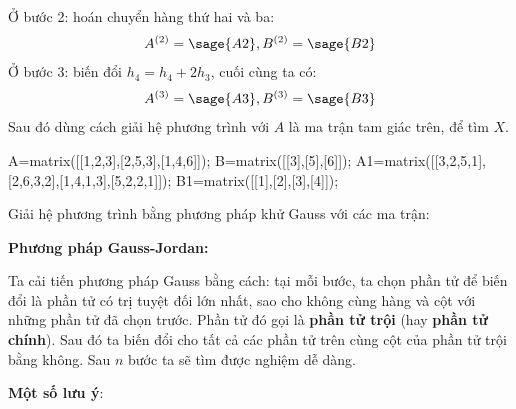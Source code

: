 \documentclass[12pt]{article}
\begin{document}
Ở bước 2: hoán chuyển hàng thứ hai và ba:
\begin{align}
 A^{(2)}=\sage{A2}, B^{(2)}=\sage{B2}
\end{align}
Ở bước 3: biến đổi $h_4=h_4+2h_3$, cuối cùng ta có:
\begin{align}
 A^{(3)}=\sage{A3}, B^{(3)}=\sage{B3}
\end{align}
Sau đó dùng cách giải hệ phương trình với $A$ là ma trận tam giác trên, để tìm $X$.

\newpage{}

\begin{sagesilent}
A=matrix([[1,2,3],[2,5,3],[1,4,6]]);
B=matrix([[3],[5],[6]]);
A1=matrix([[3,2,5,1],[2,6,3,2],[1,4,1,3],[5,2,2,1]]);
B1=matrix([[1],[2],[3],[4]]);
\end{sagesilent}
Giải hệ phương trình bằng phương pháp khử Gauss với các ma trận:

\newpage{}

\textbf{Phương pháp Gauss-Jordan:}

Ta cải tiến phương pháp Gauss bằng cách: tại mỗi bước, ta chọn phần tử để biến đổi là phần tử có trị tuyệt đối lớn nhất, sao cho không cùng hàng và cột với những phần tử đã chọn trước. Phần tử đó gọi là \textbf{phần tử trội} (hay \textbf{phần tử chính}). Sau đó ta biến đổi cho tất cả các phần tử trên cùng cột của phần tử trội bằng không. Sau $n$ bước ta sẽ tìm được nghiệm dễ dàng.


\newpage{}

\textbf{Một số lưu ý}:
\end{document}
